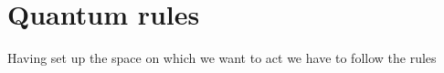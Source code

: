 \section{Quantum rules}
Having set up the space on which we want to act we have to follow the rules 